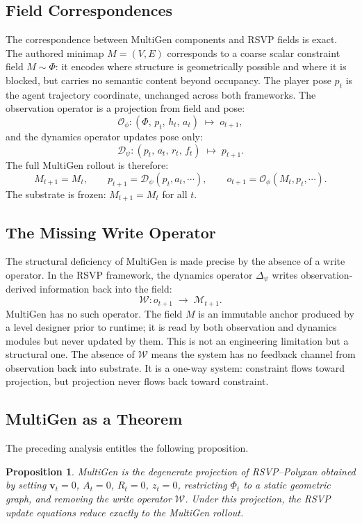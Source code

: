 \documentclass[11pt]{article}
\newtheorem{proposition}[theorem]{Proposition}
\begin{document}
\subsection{Field Correspondences}

The correspondence between MultiGen components and RSVP fields is exact.
The authored minimap $M = (V,E)$ corresponds to a coarse scalar constraint
field $M \sim \Phi$: it encodes where structure is geometrically possible
and where it is blocked, but carries no semantic content beyond occupancy.
The player pose $p_t$ is the agent trajectory coordinate, unchanged across
both frameworks.
The observation operator is a projection from field and pose:
\[
\mathcal{O}_\phi : (\Phi,\, p_t,\, h_t,\, a_t) \;\mapsto\; o_{t+1},
\]
and the dynamics operator updates pose only:
\[
\mathcal{D}_\psi : (p_t,\, a_t,\, r_t,\, f_t) \;\mapsto\; p_{t+1}.
\]
The full MultiGen rollout is therefore:
\[
M_{t+1} = M_t, \qquad
p_{t+1} = \mathcal{D}_\psi(p_t, a_t, \cdots), \qquad
o_{t+1} = \mathcal{O}_\phi(M_t, p_t, \cdots).
\]
The substrate is frozen: $M_{t+1} = M_t$ for all $t$.

\subsection{The Missing Write Operator}

The structural deficiency of MultiGen is made precise by the absence of a
write operator.
In the RSVP framework, the dynamics operator $\Delta_\psi$ writes
observation-derived information back into the field:
\[
\mathcal{W} : o_{t+1} \;\longrightarrow\; \mathcal{M}_{t+1}.
\]
MultiGen has no such operator.
The field $M$ is an immutable anchor produced by a level designer prior to
runtime; it is read by both observation and dynamics modules but never
updated by them.
This is not an engineering limitation but a structural one.
The absence of $\mathcal{W}$ means the system has no feedback channel from
observation back into substrate.
It is a one-way system: constraint flows toward projection, but projection
never flows back toward constraint.

\subsection{MultiGen as a Theorem}

The preceding analysis entitles the following proposition.

\begin{proposition}
MultiGen is the degenerate projection of RSVP--Polyxan obtained by
setting $\mathbf{v}_t = 0$, $A_t = 0$, $R_t = 0$, $z_t = 0$,
restricting $\Phi_t$ to a static geometric graph, and removing the
write operator $\mathcal{W}$.
Under this projection, the RSVP update equations reduce exactly to the
MultiGen rollout.
\end{proposition}
\end{document}
